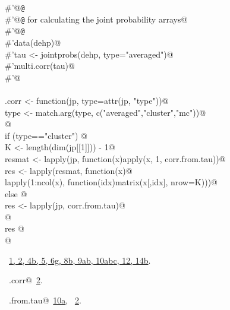 \documentclass[reqno]{amsart}
\renewcommand{\NWlink}[2]{\hyperlink{#1}{#2}}
\begin{document}
\begin{flushleft}
\begin{list}{}{}
\mbox{}\verb@#'@{\tt @}\verb@export@\\
\mbox{}\verb@#'@{\tt @}\verb@seealso {} for calculating the joint probability arrays@\\
\mbox{}\verb@#'@{\tt @}\verb@examples@\\
\mbox{}\verb@#'data(dehp)@\\
\mbox{}\verb@#'tau <- jointprobs(dehp, type="averaged")@\\
\mbox{}\verb@#'multi.corr(tau)@\\
\mbox{}\verb@#'@\\
\mbox{}\verb@@\\
\mbox{}\verb@multi.corr <- function(jp, type=attr(jp, "type")){@\\
\mbox{}\verb@  type <- match.arg(type, c("averaged","cluster","mc"))@\\
\mbox{}\verb@  @\\
\mbox{}\verb@  if (type=="cluster") {@\\
\mbox{}\verb@    K <- length(dim(jp[[1]])) - 1@\\
\mbox{}\verb@    resmat <- lapply(jp, function(x)apply(x, 1, corr.from.tau))@\\
\mbox{}\verb@    res <- lapply(resmat, function(x){@\\
\mbox{}\verb@                  lapply(1:ncol(x), function(idx)matrix(x[,idx], nrow=K))})@\\
\mbox{}\verb@  } else {@\\
\mbox{}\verb@    res <- lapply(jp, corr.from.tau)@\\
\mbox{}\verb@  }@\\
\mbox{}\verb@  res  @\\
\mbox{}\verb@}@\\
\mbox{}\verb@@{\NWsep}
\end{list}
\vspace{-1.5ex}
\footnotesize
\begin{list}{}{\setlength{\itemsep}{-\parsep}\setlength{\itemindent}{-\leftmargin}}
\item \NWtxtFileDefBy\ \NWlink{nuweb1}{1}\NWlink{nuweb2}{, 2}\NWlink{nuweb4b}{, 4b}\NWlink{nuweb5}{, 5}\NWlink{nuweb6g}{, 6g}\NWlink{nuweb8b}{, 8b}\NWlink{nuweb9a}{, 9a}\NWlink{nuweb9b}{b}\NWlink{nuweb10a}{, 10a}\NWlink{nuweb10b}{b}\NWlink{nuweb10c}{c}\NWlink{nuweb12}{, 12}\NWlink{nuweb14b}{, 14b}.
\item \NWtxtIdentsDefed\nobreak\  \verb@multi.corr@\nobreak\ \NWlink{nuweb2}{2}.\item \NWtxtIdentsUsed\nobreak\  \verb@corr.from.tau@\nobreak\ \NWlink{nuweb10a}{10a}, \verb@tau@\nobreak\ \NWlink{nuweb2}{2}.
\item{}
\end{list}
\vspace{4ex}
\end{flushleft}
\end{document}
